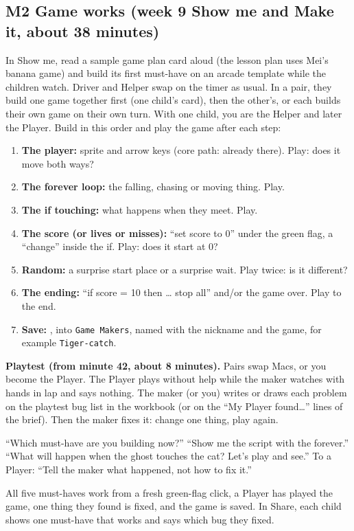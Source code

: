\documentclass[track=junior,level=2,teacher]{kidscode}
\begin{document}
\subsection{M2 Game works (week 9 Show me and Make it, about 38 minutes)}
In Show me, read a sample game plan card aloud (the lesson plan uses Mei's banana game) and build its
first must-have on an arcade template while the children watch.
Driver and Helper swap on the timer as usual. In a pair, they build one game together first (one
child's card), then the other's, or each builds their own game on their own turn. With one child, you
are the Helper and later the Player. Build in this order and play the game after each step:
\begin{enumerate}[itemsep=2pt]
  \item \textbf{The player:} sprite and arrow keys (core path: already there). Play: does it move both ways?
  \item \textbf{The forever loop:} the falling, chasing or moving thing. Play.
  \item \textbf{The if touching:} what happens when they meet. Play.
  \item \textbf{The score (or lives or misses):} \enquote{set score to 0} under the green flag, a
        \enquote{change} inside the if. Play: does it start at 0?
  \item \textbf{Random:} a surprise start place or a surprise wait. Play twice: is it different?
  \item \textbf{The ending:} \enquote{if score = 10 then \ldots{} stop all} and/or the game over. Play to the end.
  \item \textbf{Save:} , into \texttt{Game Makers}, named with the
        nickname and the game, for example \texttt{Tiger-catch}.
\end{enumerate}
\textbf{Playtest (from minute 42, about 8 minutes).} Pairs swap Macs, or you become the Player.
The Player plays without help while the maker watches with hands in lap and says nothing. The
maker (or you) writes or draws each problem on the playtest bug list in the workbook (or on the
\enquote{My Player found\ldots} lines of the brief).
Then the maker fixes it: change one thing, play again.
\begin{teacherscript}
\enquote{Which must-have are you building now?} \enquote{Show me the script with the forever.}
\enquote{What will happen when the ghost touches the cat? Let's play and see.} To a Player:
\enquote{Tell the maker what happened, not how to fix it.}
\end{teacherscript}
\begin{formativecheck}
All five must-haves work from a fresh green-flag click, a Player has played the game, one thing they
found is fixed, and the game is saved. In Share, each child shows one must-have that works and says
which bug they fixed.
\end{formativecheck}
\end{document}
